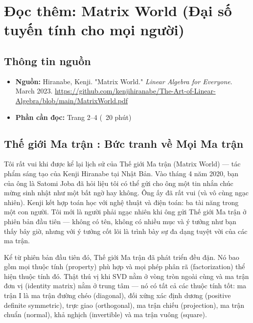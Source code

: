 \chapter{Đọc thêm: Matrix World (Đại số tuyến tính cho mọi người)}
\label{ch:M2L3-reading}


\section{Thông tin nguồn}

\begin{itemize}
  \item \textbf{Nguồn:} Hiranabe, Kenji. "Matrix World." \emph{Linear Algebra for Everyone}. March 2023. \url{https://github.com/kenjihiranabe/The-Art-of-Linear-Algebra/blob/main/MatrixWorld.pdf}
  \item \textbf{Phần cần đọc:} Trang 2--4 (~20 phút)
\end{itemize}

\section{Thế giới Ma trận : Bức tranh về Mọi Ma trận}

Tôi rất vui khi được kể lại lịch sử của Thế giới Ma trận (Matrix World) --- tác phẩm sáng tạo của Kenji Hiranabe tại Nhật Bản. Vào tháng 4 năm 2020, bạn của ông là Satomi Joba đã hỏi liệu tôi có thể gửi cho ông một tin nhắn chúc mừng sinh nhật như một bất ngờ hay không. Ông ấy đã rất vui (và vô cùng ngạc nhiên). Kenji kết hợp toán học với nghệ thuật và điện toán: ba tài năng trong một con người. Tôi mới là người phải ngạc nhiên khi ông gửi Thế giới Ma trận ở phiên bản đầu tiên --- không có tên, không có nhiều mục và ý tưởng như bạn thấy bây giờ, nhưng với ý tưởng cốt lõi là trình bày sự đa dạng tuyệt vời của các ma trận.

Kể từ phiên bản đầu tiên đó, Thế giới Ma trận đã phát triển đều đặn. Nó bao gồm mọi thuộc tính (property) phù hợp và mọi phép phân rã (factorization) thể hiện thuộc tính đó. Thật thú vị khi SVD nằm ở vòng tròn ngoài cùng và ma trận đơn vị (identity matrix) nằm ở trung tâm --- nó có tất cả các thuộc tính tốt: ma trận I là ma trận đường chéo (diagonal), đối xứng xác định dương (positive definite symmetric), trực giao (orthogonal), ma trận chiếu (projection), ma trận chuẩn (normal), khả nghịch (invertible) và ma trận vuông (square).


